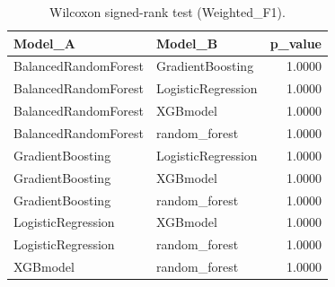 \begin{table}[t]
\centering
\begin{tabular}{llr}
\toprule
Model_A & Model_B & p_value \\
\midrule
BalancedRandomForest & GradientBoosting & 1.0000 \\
BalancedRandomForest & LogisticRegression & 1.0000 \\
BalancedRandomForest & XGBmodel & 1.0000 \\
BalancedRandomForest & random_forest & 1.0000 \\
GradientBoosting & LogisticRegression & 1.0000 \\
GradientBoosting & XGBmodel & 1.0000 \\
GradientBoosting & random_forest & 1.0000 \\
LogisticRegression & XGBmodel & 1.0000 \\
LogisticRegression & random_forest & 1.0000 \\
XGBmodel & random_forest & 1.0000 \\
\bottomrule
\end{tabular}
\caption{Wilcoxon signed-rank test (Weighted_F1).}
\label{tab:wilcoxon_Weighted_F1}
\end{table}